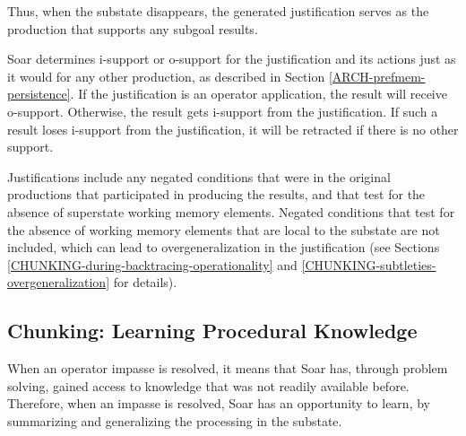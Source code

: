 Thus, when the substate disappears, the generated justification serves as the production that supports any subgoal results.

Soar determines i-support or o-support for the justification and its actions just as it would for any other production, as described in Section \ref{ARCH-prefmem-persistence}.  If the justification is an operator application, the result will receive o-support.  Otherwise, the result gets i-support from the justification. If such a result loses i-support from the justification, it will be retracted if there is no other support.

Justifications include any negated conditions that were in the original productions that participated in producing the results, and that test for the absence of superstate working memory elements. Negated conditions that test for the absence of working memory elements that are local to the substate are not included, which can lead to overgeneralization in the justification (see Sections \ref{CHUNKING-during-backtracing-operationality} and \ref{CHUNKING-subtleties-overgeneralization} for details).



\subsection{Chunking: Learning Procedural Knowledge}
\label{ARCH-learning}

When an operator impasse is resolved, it means that Soar has, through problem solving, gained access to knowledge that was not readily available before. Therefore, when an impasse is resolved, Soar has an opportunity to learn, by summarizing and generalizing the processing in the substate.

